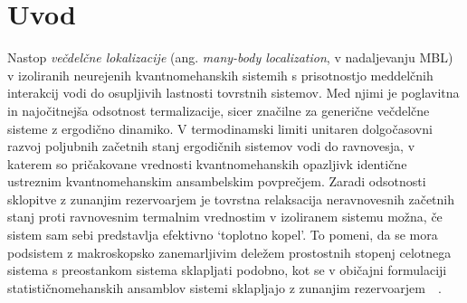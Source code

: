 \chapter{Uvod}
Nastop \emph{večdelčne lokalizacije} (ang. \emph{many-body localization}, v nadaljevanju MBL) v izoliranih neurejenih kvantnomehanskih sistemih s prisotnostjo meddelčnih interakcij vodi do osupljivih lastnosti tovrstnih sistemov. Med njimi je poglavitna in najočitnejša odsotnost termalizacije, sicer značilne za generične večdelčne sisteme z ergodično dinamiko. V termodinamski limiti unitaren dolgočasovni razvoj poljubnih začetnih stanj ergodičnih sistemov vodi do ravnovesja, v katerem so pričakovane vrednosti kvantnomehanskih opazljivk identične ustreznim kvantnomehanskim ansambelskim povprečjem. Zaradi odsotnosti sklopitve z zunanjim rezervoarjem je tovrstna relaksacija neravnovesnih začetnih stanj proti ravnovesnim termalnim vrednostim v izoliranem sistemu možna, če sistem sam sebi predstavlja efektivno `toplotno kopel'. To pomeni, da se mora podsistem z makroskopsko zanemarljivim deležem prostostnih stopenj  celotnega sistema s preostankom sistema sklapljati podobno, kot se v običajni formulaciji statističnomehanskih ansamblov sistemi sklapljajo z zunanjim rezervoarjem~\cite{abanin2018ergodicity}~\cite{nandkishore2015many}. \\\\
